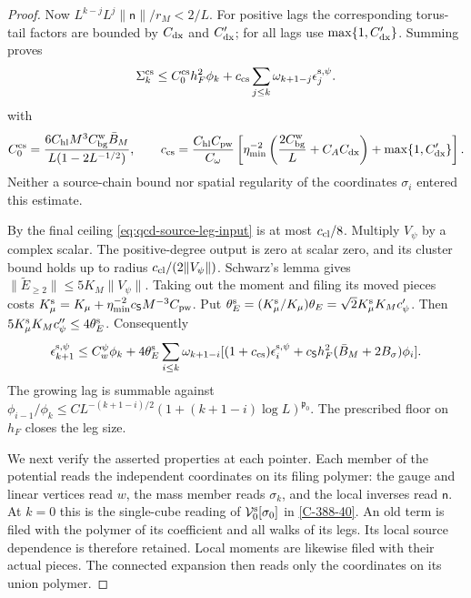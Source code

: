 \documentclass[11pt,letterpaper,reqno]{amsart}
\theoremstyle{definition}
\theoremstyle{remark}
\begin{document}
\begin{proof}
Now $L^{k-j}L^j\|\mathsf n\|/r_M<2/L$. For positive lags
the corresponding torus-tail factors are bounded by
$C_{\rm dx}$ and $C'_{\rm dx}$; for all lags use
$\max\{1,C'_{\rm dx}\}$. Summing proves
\begin{equation}\label{eq:qcd-source-cell-sum}
 \Sigma_k^{\rm cs}\le C_0^{\rm cs}h_F^2\phi_k+
 c_{\rm cs}\sum_{j\le k}\omega_{k+1-j}
                                  \epsilon_j^{{\rm s},\psi}.
\end{equation}
with
\[
 C_0^{\rm cs}=\frac{6C_{\rm hl}M^3C_{\rm bg}^{\rm w}\bar B_M}
                         {L(1-2L^{-1/2})},\qquad
 c_{\rm cs}=\frac{C_{\rm hl}C_{\rm pw}}{C_\omega}
 \left[\eta_{\min}^{-2}
       \left(\frac{2C_{\rm bg}^{\rm w}}L+C_AC_{\rm dx}\right)
          +\max\{1,C'_{\rm dx}\}\right].
\]
Neither a source-chain bound nor spatial regularity of the
coordinates $\sigma_i$ entered this estimate.

By the final ceiling \eqref{eq:qcd-source-leg-input} is at
most $c_{\rm cl}/8$. Multiply $V_\psi$ by a complex scalar.
The positive-degree output is zero at scalar zero, and its
cluster bound holds up to radius
$c_{\rm cl}/(2\|V_\psi\|)$. Schwarz's lemma gives
$\|\widetilde E_{\ge2}\|\le5K_M\|V_\psi\|$.
Taking out the moment and filing its moved pieces costs
$K_\mu^{\rm s}=K_\mu+\eta_{\min}^{-2}c_{\mathsf S}M^{-3}C_{\rm pw}$.
Put $\theta_E^{\rm s}=(K_\mu^{\rm s}/K_\mu)\theta_E
=\sqrt2K_\mu^{\rm s}K_Mc'_\psi$. Then
$5K_\mu^{\rm s}K_Mc''_\psi\le4\theta_E^{\rm s}$.
Consequently
\[
 \epsilon_{k+1}^{{\rm s},\psi}\le C_w^\psi\phi_k+
 4\theta_E^{\rm s}\sum_{i\le k}\omega_{k+1-i}
 [(1+c_{\rm cs})\epsilon_i^{{\rm s},\psi}
       +c_{\mathsf S}h_F^2(\bar B_M+2B_\sigma)\phi_i].
\]
The growing lag is summable against
$\phi_{i-1}/\phi_k\le CL^{-(k+1-i)/2}
(1+(k+1-i)\log L)^{\mathfrak p_0}$.
The prescribed floor on $h_F$ closes the leg size.

We next verify the asserted properties at each pointer. Each
member of the potential reads the independent coordinates on
its filing polymer: the gauge and linear vertices read $w$,
the mass member reads $\sigma_k$, and the local inverses read
$\mathsf n$.  At $k=0$ this is the single-cube reading of
$\mathcal V^{\rm s}_0[\sigma_0]$ in \cref{C-388-40}.
An old term is filed with the polymer of its
coefficient and all walks of its legs. Its local source
dependence is therefore retained. Local moments are likewise
filed with their actual pieces. The connected expansion then
reads only the coordinates on its union polymer.


\end{proof}
\end{document}
